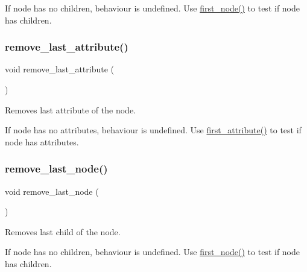 If node has no children, behaviour is undefined. Use \mbox{\hyperlink{classrapidxml_1_1xml__node_a1290dd3cfbf7cc6384593104635c96cd}{first\+\_\+node()}} to test if node has children. \mbox{\label{classrapidxml_1_1xml__node_a37d87c4d5d89fa0cf05b72ee8d4cba3b}} 
\subsubsection{\texorpdfstring{remove\+\_\+last\+\_\+attribute()}{remove\_last\_attribute()}}
{\footnotesize\ttfamily void remove\+\_\+last\+\_\+attribute (\begin{DoxyParamCaption}{ }\end{DoxyParamCaption})\hspace{0.3cm}{\ttfamily [inline]}}



Removes last attribute of the node. 

If node has no attributes, behaviour is undefined. Use \mbox{\hyperlink{classrapidxml_1_1xml__node_a3cbbee0d76d96c3315cc9d80d169c8d9}{first\+\_\+attribute()}} to test if node has attributes. \mbox{\label{classrapidxml_1_1xml__node_a87addf2bc127ee31aa4b5295d3c9b530}} 
\subsubsection{\texorpdfstring{remove\+\_\+last\+\_\+node()}{remove\_last\_node()}}
{\footnotesize\ttfamily void remove\+\_\+last\+\_\+node (\begin{DoxyParamCaption}{ }\end{DoxyParamCaption})\hspace{0.3cm}{\ttfamily [inline]}}



Removes last child of the node. 

If node has no children, behaviour is undefined. Use \mbox{\hyperlink{classrapidxml_1_1xml__node_a1290dd3cfbf7cc6384593104635c96cd}{first\+\_\+node()}} to test if node has children. \mbox{\label{classrapidxml_1_1xml__node_a9316463a2201631e7e2062b17729f9cd}} 
